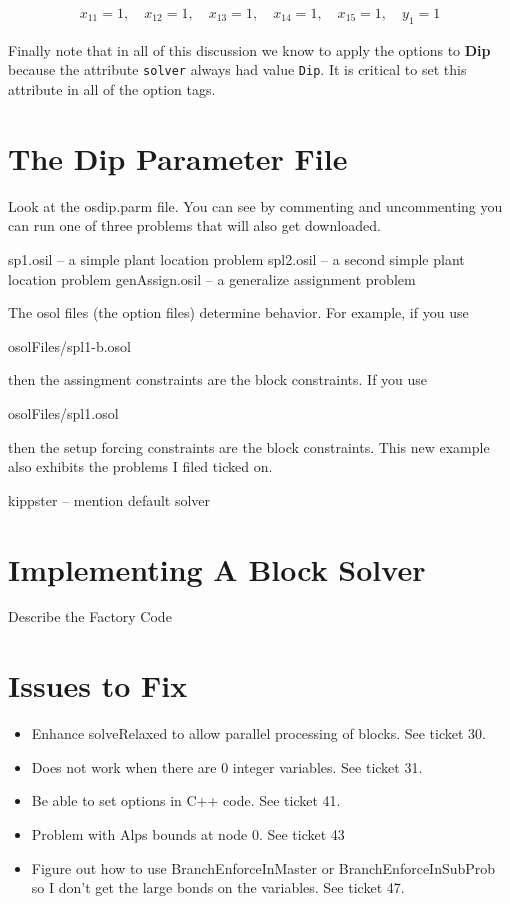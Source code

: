 \documentclass[11pt]{article}
\newcounter{Fig}
\begin{document}
\begin{eqnarray*}
x_{11} = 1, \quad  x_{12} = 1, \quad  x_{13} = 1, \quad  x_{14} = 1, \quad
x_{15} = 1, \quad y_{1} = 1
\end{eqnarray*}


Finally note that in all of this discussion we know to apply the options to {\bf
Dip} because the attribute {\tt solver} always had value {\tt Dip}. It is
critical to set this attribute in all of the option tags. 


\section{The Dip Parameter File}\label{section:paramaterfile}

Look at the osdip.parm file. You can see by commenting and uncommenting you can
run one of three problems that will also get downloaded.

sp1.osil -- a simple plant location problem spl2.osil -- a second simple plant
location problem genAssign.osil -- a generalize assignment problem

The osol files (the option files) determine behavior. For example, if you use

osolFiles/spl1-b.osol

then the assingment constraints are the block constraints. If you use

osolFiles/spl1.osol

then the setup forcing constraints are the block constraints.  This  new  example
also exhibits the problems I filed ticked on.


kippster -- mention default solver
\section{Implementing A Block Solver}

Describe the Factory Code

\section{Issues to Fix}

\begin{itemize}
  \item Enhance solveRelaxed to allow parallel processing of blocks. See ticket
  30.
  \item Does not work when there are 0 integer variables. See ticket 31.
  \item Be able to set options in C++ code. See ticket 41.
  \item Problem with Alps  bounds at node 0. See ticket 43
  \item Figure out how to use BranchEnforceInMaster or BranchEnforceInSubProb so
  I don't get the large bonds on the variables. See ticket 47.
\end{itemize}




 
\end{document}
